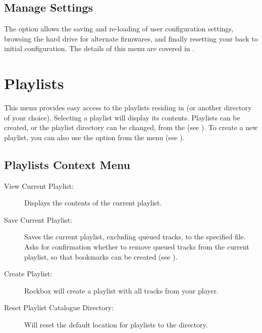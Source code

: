 
\subsection{Manage Settings}
The  option allows the saving and re-loading of user 
configuration settings, browsing the hard drive for alternate firmwares, and finally
resetting your \dap{} back to initial configuration.
%
The details of this menu are covered in
.



\section{\label{ref:playlistoptions}Playlists}
  This menu provides easy access to the playlists residing in  (or another
  directory of your choice). Selecting a playlist will display its contents.
  Playlists can be created, or the playlist directory can be changed, from the
   (see ).
  To create a new playlist, you can also use the  option from the
   menu (see ).

\subsection{\label{ref:playlistcatalogue_contextmenu}Playlists Context Menu}

\begin{description}
\item[View Current Playlist:]
  Displays the contents of the current playlist.

\item[Save Current Playlist:]
  Saves the current playlist, excluding queued tracks, to the
specified file. Asks for confirmation whether to remove queued tracks
from the current playlist, so that bookmarks can be created
(see ).

\item[Create Playlist:]
  Rockbox will create a playlist with all tracks from your player.

\item[Reset Playlist Catalogue Directory:]
  Will reset the default location for playlists to the 
directory.

\end{description}


